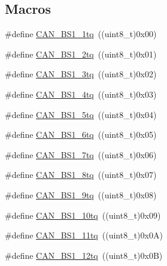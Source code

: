 \subsection*{Macros}
\begin{DoxyCompactItemize}
\item 
\#define \hyperlink{group___c_a_n__time__quantum__in__bit__segment__1_ga76b8fb0815b7a3f398fffe72dda0bc04}{C\+A\+N\+\_\+\+B\+S1\+\_\+1tq}~((uint8\+\_\+t)0x00)
\item 
\#define \hyperlink{group___c_a_n__time__quantum__in__bit__segment__1_ga1544ecf902e6173859d60cff9530971a}{C\+A\+N\+\_\+\+B\+S1\+\_\+2tq}~((uint8\+\_\+t)0x01)
\item 
\#define \hyperlink{group___c_a_n__time__quantum__in__bit__segment__1_gaa808099663480de935d3ce9187c2dcab}{C\+A\+N\+\_\+\+B\+S1\+\_\+3tq}~((uint8\+\_\+t)0x02)
\item 
\#define \hyperlink{group___c_a_n__time__quantum__in__bit__segment__1_ga7c5c668200f41991e14b31ca20235000}{C\+A\+N\+\_\+\+B\+S1\+\_\+4tq}~((uint8\+\_\+t)0x03)
\item 
\#define \hyperlink{group___c_a_n__time__quantum__in__bit__segment__1_ga31dea95492dababfcf79bcaeb884b99e}{C\+A\+N\+\_\+\+B\+S1\+\_\+5tq}~((uint8\+\_\+t)0x04)
\item 
\#define \hyperlink{group___c_a_n__time__quantum__in__bit__segment__1_gaa7fc6fcdf9c1c70ee9700b35e32e205e}{C\+A\+N\+\_\+\+B\+S1\+\_\+6tq}~((uint8\+\_\+t)0x05)
\item 
\#define \hyperlink{group___c_a_n__time__quantum__in__bit__segment__1_gafec90578d657073a671b6326f3bfcf8e}{C\+A\+N\+\_\+\+B\+S1\+\_\+7tq}~((uint8\+\_\+t)0x06)
\item 
\#define \hyperlink{group___c_a_n__time__quantum__in__bit__segment__1_ga1049ea9bc5b3da680574ca444e888de4}{C\+A\+N\+\_\+\+B\+S1\+\_\+8tq}~((uint8\+\_\+t)0x07)
\item 
\#define \hyperlink{group___c_a_n__time__quantum__in__bit__segment__1_ga0493701bdd73a9649510f035439a6580}{C\+A\+N\+\_\+\+B\+S1\+\_\+9tq}~((uint8\+\_\+t)0x08)
\item 
\#define \hyperlink{group___c_a_n__time__quantum__in__bit__segment__1_gaf1b474aa632787e70bedd0c5dfdbf5ed}{C\+A\+N\+\_\+\+B\+S1\+\_\+10tq}~((uint8\+\_\+t)0x09)
\item 
\#define \hyperlink{group___c_a_n__time__quantum__in__bit__segment__1_ga4f765ffbe7fda4fb6d0fde7bc4058a14}{C\+A\+N\+\_\+\+B\+S1\+\_\+11tq}~((uint8\+\_\+t)0x0\+A)
\item 
\#define \hyperlink{group___c_a_n__time__quantum__in__bit__segment__1_ga14c4e928f615babc14c6a9e80ee86a6c}{C\+A\+N\+\_\+\+B\+S1\+\_\+12tq}~((uint8\+\_\+t)0x0\+B)

\end{DoxyCompactItemize}
